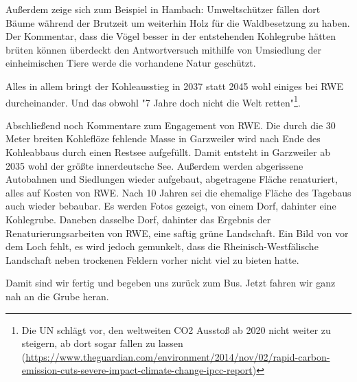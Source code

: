 \documentclass{article}
\begin{document}
Außerdem zeige sich zum Beispiel in Hambach: Umweltschützer fällen dort Bäume während der Brutzeit um weiterhin
Holz für die Waldbesetzung zu haben.
Der Kommentar, dass die Vögel besser in der entstehenden Kohlegrube hätten brüten können überdeckt den Antwortversuch
mithilfe von Umsiedlung der einheimischen Tiere werde die vorhandene Natur geschützt.

Alles in allem bringt der Kohleausstieg in 2037 statt 2045 wohl einiges bei RWE durcheinander.
Und das obwohl "7 Jahre doch nicht die Welt retten"\footnote{Die UN schlägt vor, den weltweiten CO2 Ausstoß ab 2020 nicht weiter zu steigern, ab dort sogar fallen zu lassen (\url{https://www.theguardian.com/environment/2014/nov/02/rapid-carbon-emission-cuts-severe-impact-climate-change-ipcc-report})}.

Abschließend noch Kommentare zum Engagement von RWE.
Die durch die 30 Meter breiten Kohleflöze fehlende Masse in Garzweiler wird nach Ende des Kohleabbaus durch einen Restsee aufgefüllt.
Damit entsteht in Garzweiler ab 2035 wohl der größte innerdeutsche See.
Außerdem werden abgerissene Autobahnen und Siedlungen wieder aufgebaut, abgetragene Fläche renaturiert, 
alles auf Kosten von RWE.
Nach 10 Jahren sei die ehemalige Fläche des Tagebaus auch wieder bebaubar.
Es werden Fotos gezeigt, von einem Dorf, dahinter eine Kohlegrube.
Daneben dasselbe Dorf, dahinter das Ergebnis der Renaturierungsarbeiten von RWE, eine saftig grüne Landschaft.
Ein Bild von vor dem Loch fehlt, es wird jedoch gemunkelt, dass die Rheinisch-Westfälische Landschaft neben trockenen
Feldern vorher nicht viel zu bieten hatte.

Damit sind wir fertig und begeben uns zurück zum Bus.
Jetzt fahren wir ganz nah an die Grube heran.
\end{document}
